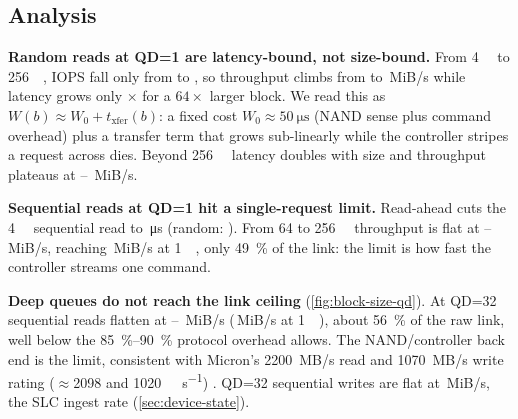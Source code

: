 \subsection{Analysis}
\textbf{Random reads at QD=1 are latency-bound, not size-bound.} From \qty{4}{\kibi\byte} to
\qty{256}{\kibi\byte}, IOPS fall only from
 to
, so throughput climbs from
 to
\,MiB/s while latency grows only
\csvget{}%
\csvget{}%
\ssdratio{\ssdA}{\ssdB}$\times$ for a $64\times$ larger block. We read this as
$W(b)\approx W_0 + t_\text{xfer}(b)$: a fixed cost $W_0\approx\qty{50}{\micro\second}$ (NAND sense plus
command overhead) plus a transfer term that grows sub-linearly while the controller stripes a request
across dies. Beyond \qty{256}{\kibi\byte} latency doubles with size and throughput plateaus at
--%
\,MiB/s.

\textbf{Sequential reads at QD=1 hit a single-request limit.} Read-ahead cuts the \qty{4}{\kibi\byte}
sequential read to \,\si{\micro\second}
(random: ). From 64 to
\qty{256}{\kibi\byte} throughput is flat at
--%
\,MiB/s, reaching
\,MiB/s at \qty{1}{\mebi\byte},
only \qty{49}{\percent} of the link: the limit is how fast the controller streams one command.

\textbf{Deep queues do not reach the link ceiling} (\cref{fig:block-size-qd}). At QD=32 sequential reads
flatten at --%
\,MiB/s
(\,MiB/s at \qty{1}{\mebi\byte}),
about \qty{56}{\percent} of the raw link, well below the \qtyrange{85}{90}{\percent} protocol overhead
allows. The NAND/controller back end is the limit, consistent with Micron's \qty{2200}{MB/s} read and
\qty{1070}{MB/s} write rating (\ensuremath{\approx}\num{2098} and \qty{1020}{\mebi\byte\per\second})
\cite{micron2210brief}. QD=32 sequential writes are flat at
\,MiB/s, the SLC ingest rate
(\cref{sec:device-state}).

